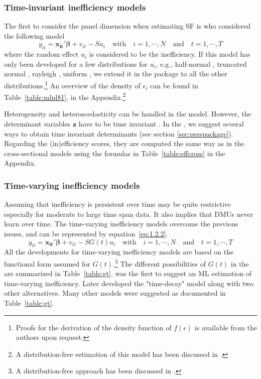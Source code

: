 \documentclass[nojss]{jss}
\begin{document}
\subsubsection{Time-invariant inefficiency models}

The first to consider the panel dimension when estimating SF is \citet{pl81} who
considered the following model
%
\begin{equation} \label{eq:1.2.1}
y_{it} = \mathbf{x_{it}'}\bm{\beta} + v_{it} - Su_i \quad \text{with} \quad i = 1, \cdots, N \quad \text{and} \quad t = 1, \cdots, T
\end{equation}
%
where the random effect $u_i$ is considered to be the inefficiency. If this model
has only been developed for a few distributions for $u_i$, e.g., half-normal \citep{pl81}, 
truncated normal \citep{batt88}, rayleigh \citep{hajar15}, uniform \citep{nguyen10}, we extend it in the  package to all the
other distributions.\footnote{Proofs for the derivation of the density function
of $f(\epsilon)$ is available from the authors upon request.} 
An overview of the density of $\epsilon_i$ can be found in 
Table~\ref{table:mlpl81}, in the Appendix.\footnote{A distribution-free 
estimation of this model has been discussed in \citet{sl84}.}

Heterogeneity and heteroscedasticity can be handled in the \citet{pl81} model.
However, the determinant variables $\mathbf{z}$ have to be time invariant \citep{kum2000}. In the
, we suggest several ways to obtain time invariant determinants (see section \ref{sec:prespackage}).
Regarding the (in)efficiency scores, they are computed the same way as in the 
cross-sectional models using the formulas in Table~\ref{table:effcross} in the 
Appendix.

\subsubsection{Time-varying inefficiency models}

Assuming that inefficiency is persistent over time may be quite restrictive 
especially for moderate to large time span data. It also implies that DMUs
never learn over time. The time-varying inefficiency models overcome the 
previous issues, and can be represented by equation~\ref{eq:1.2.2}.
%
\begin{equation} \label{eq:1.2.2}
y_{it} = \mathbf{x_{it}'}\bm{\beta} + v_{it} - SG(t)u_i \quad \text{with} \quad i = 1, \cdots, N \quad \text{and} \quad t = 1, \cdots, T
\end{equation}
%
All the developments for time-varying inefficiency models are based on the 
functional form assumed for $G(t)$.\footnote{A distribution-free approach has 
been discussed in \citet{css90, lees93}.} The different possibilities of $G(t)$ in 
the  are summarized in Table~\ref{table:gt}. \citet{kum90} was the 
first to suggest an ML estimation of time-varying inefficiency. Later \citet{batco92}
developed the "time-decay" model along with two other alternatives. Many other
models were suggested as documented in Table~\ref{table:gt}. 
\end{document}
